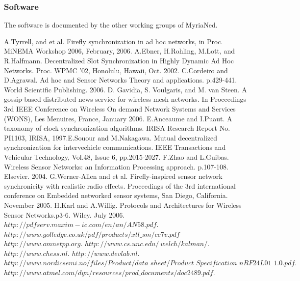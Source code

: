 \documentclass[a4paper,10pt]{report}
\begin{document}
\subsubsection{Software}
The software is documented by the other working groups of MyriaNed.
\begin{thebibliography}{\textbf{References}}
A.Tyrrell, and et al. Firefly synchronization in ad hoc networks, in Proc. MiNEMA Workshop 2006, February, 2006.
A.Ebner, H.Rohling, M.Lott, and R.Halfmann. Decentralized Slot Synchronization in Highly Dynamic Ad Hoc Networks. Proc. WPMC '02, Honolulu, Hawaii, Oct. 2002.
C.Cordeiro and D.Agrawal. Ad hoc and Sensor Networks Theory and applications. p.429-441. World Scientific Publishing. 2006.
D. Gavidia, S. Voulgaris, and M. van Steen. A gossip-based distributed news service for wireless mesh networks. In Proceedings 3rd IEEE Conference on Wireless On demand Network Systems and Services (WONS), Les Menuires, France, January 2006.
E.Anceaume and I.Puaut. A taxonomy of clock synchronization algorithms. IRISA Research Report No. PI1103, IRISA, 1997.E.Souour and M.Nakagawa. Mutual decentralized synchronization for intervechicle communications. IEEE Transactions and Vehicular Technology, Vol.48, Issue 6, pp.2015-2027.
F.Zhao and  L.Guibas. Wireless Sensor Networks: an Information Processing approach. p.107-108. Elsevier. 2004.
G.Werner-Allen and et al. Firefly-inspired sensor network synchronicity with realistic radio effects. Proceedings of the 3rd international conference on Embedded networked sensor systems, San Diego, California. November 2005.
H.Karl and A.Willig. Protocols and Architectures for Wireless Sensor Networks.p3-6. Wiley. July 2006.
$http://pdfserv.maxim-ic.com/en/an/AN58.pdf$.
 $http://www.golledge.co.uk/pdf/products/xtl\_sm/cc7v.pdf$
$http://www.omnetpp.org$.
$http://www.cs.unc.edu/~welch/kalman/$.
$http://www.chess.nl$.
$http://www.devlab.nl.$
$http://www.nordicsemi.no/files/Product/data\_sheet/Product\_Specification\_nRF24L01\_1.0.pdf.$
$http://www.atmel.com/dyn/resources/prod\_documents/doc2489.pdf.$

\end{thebibliography}
\end{document}
